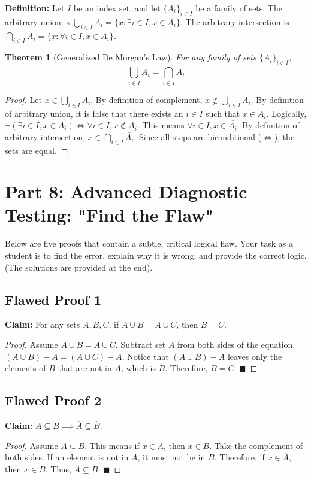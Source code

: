 \documentclass[11pt, a4paper]{article}
\newtheorem{theorem}{Theorem}[section]
\theoremstyle{definition}
\theoremstyle{remark}
\begin{document}
\textbf{Definition:} Let $I$ be an index set, and let $\{A_i\}_{i \in I}$ be a family of sets. 
The arbitrary union is $\bigcup_{i \in I} A_i = \{x : \exists i \in I, x \in A_i\}$.
The arbitrary intersection is $\bigcap_{i \in I} A_i = \{x : \forall i \in I, x \in A_i\}$.

\begin{theorem}[Generalized De Morgan's Law]
For any family of sets $\{A_i\}_{i \in I}$, 
\[
    \overline{\bigcup_{i \in I} A_i} = \bigcap_{i \in I} \overline{A_i}
\]
\end{theorem}

\begin{proof}
Let $x \in \overline{\bigcup_{i \in I} A_i}$. 
By definition of complement, $x \notin \bigcup_{i \in I} A_i$.
By definition of arbitrary union, it is false that there exists an $i \in I$ such that $x \in A_i$.
Logically, $\neg(\exists i \in I, x \in A_i) \iff \forall i \in I, x \notin A_i$.
This means $\forall i \in I, x \in \overline{A_i}$.
By definition of arbitrary intersection, $x \in \bigcap_{i \in I} \overline{A_i}$.
Since all steps are biconditional ($\iff$), the sets are equal.
\end{proof}

\section{Part 8: Advanced Diagnostic Testing: "Find the Flaw"}

Below are five proofs that contain a subtle, critical logical flaw. Your task as a student is to find the error, explain why it is wrong, and provide the correct logic. (The solutions are provided at the end).

\subsection{Flawed Proof 1}
\textbf{Claim:} For any sets $A, B, C$, if $A \cup B = A \cup C$, then $B = C$.
\begin{proof}
Assume $A \cup B = A \cup C$. 
Subtract set $A$ from both sides of the equation.
$(A \cup B) - A = (A \cup C) - A$.
Notice that $(A \cup B) - A$ leaves only the elements of $B$ that are not in $A$, which is $B$.
Therefore, $B = C$. $\blacksquare$
\end{proof}

\subsection{Flawed Proof 2}
\textbf{Claim:} $A \subseteq B \implies \overline{A} \subseteq \overline{B}$.
\begin{proof}
Assume $A \subseteq B$. This means if $x \in A$, then $x \in B$.
Take the complement of both sides. If an element is not in $A$, it must not be in $B$.
Therefore, if $x \in \overline{A}$, then $x \in \overline{B}$.
Thus, $\overline{A} \subseteq \overline{B}$. $\blacksquare$
\end{proof}
\end{document}
